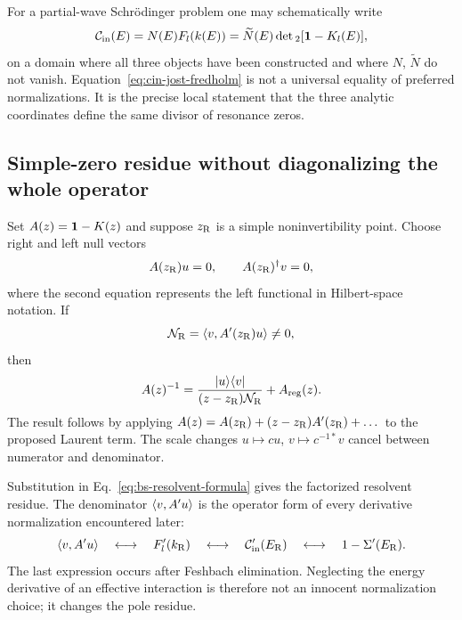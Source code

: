 For a partial-wave Schr\"odinger problem one may schematically write
\begin{equation}
  \mathcal{C}_{\mathrm{in}}(E)
  =N(E)F_l(k(E))
  =\widetilde N(E)\det{}_2[\mathbf{1}-K_l(E)],
  \label{eq:cin-jost-fredholm}
\end{equation}
on a domain where all three objects have been constructed and where
$N$, $\widetilde N$ do not vanish.  Equation~\eqref{eq:cin-jost-fredholm} is not
a universal equality of preferred normalizations.  It is the precise local
statement that the three analytic coordinates define the same divisor of
resonance zeros.

\subsection{Simple-zero residue without diagonalizing the whole operator}
\label{subsec:fredholm-simple-residue}

Set $A(z)=\mathbf{1}-K(z)$ and suppose $z_{\mathrm{R}}$ is a simple
noninvertibility point.  Choose right and left null vectors
\begin{equation}
  A(z_{\mathrm{R}})u=0,
  \qquad
  A(z_{\mathrm{R}})^\dagger v=0,
  \label{eq:fredholm-left-right-null}
\end{equation}
where the second equation represents the left functional in Hilbert-space
notation.  If
\begin{equation}
  \mathcal N_{\mathrm{R}}
  =\langle v,A'(z_{\mathrm{R}})u\rangle\ne0,
  \label{eq:fredholm-derivative-normalization}
\end{equation}
then
\begin{equation}
  A(z)^{-1}
  =\frac{\lvert u \rangle\langle v \rvert}
  {(z-z_{\mathrm{R}})\mathcal N_{\mathrm{R}}}
  +A_{\mathrm{reg}}(z).
  \label{eq:fredholm-inverse-residue}
\end{equation}
The result follows by applying $A(z)=A(z_{\mathrm{R}})+
(z-z_{\mathrm{R}})A'(z_{\mathrm{R}})+\dots$ to the proposed Laurent term.
The scale changes $u\mapsto cu$, $v\mapsto c^{-1*}v$ cancel between numerator
and denominator.

Substitution in Eq.~\eqref{eq:bs-resolvent-formula} gives the factorized
resolvent residue.  The denominator
$\langle v,A'u\rangle$ is the operator form of every derivative
normalization encountered later:
\begin{equation}
  \langle v,A'u\rangle
  \quad\longleftrightarrow\quad
  F_l'(k_{\mathrm R})
  \quad\longleftrightarrow\quad
  \mathcal{C}_{\mathrm{in}}'(E_{\mathrm{R}})
  \quad\longleftrightarrow\quad
  1-\Sigma'(E_{\mathrm{R}}).
  \label{eq:derivative-normalization-dictionary}
\end{equation}
The last expression occurs after Feshbach elimination.  Neglecting the energy
derivative of an effective interaction is therefore not an innocent
normalization choice; it changes the pole residue.

